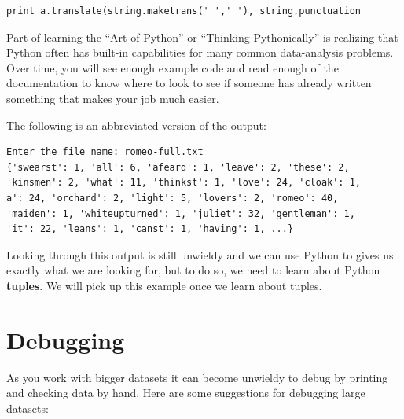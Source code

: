 \documentclass[10pt]{book}
\begin{document}
\beforeverb
\begin{verbatim}
print a.translate(string.maketrans(' ',' '), string.punctuation
\end{verbatim}
\afterverb
%
Part of learning the ``Art of Python'' or ``Thinking Pythonically''
is realizing that Python
often has built-in capabilities for many common data-analysis
problems.  Over time, you will see enough example code and read
enough of the documentation to know where to look to see if someone
has already written something that makes your job much easier.

The following is an abbreviated version of the output:
\beforeverb
\begin{verbatim}
Enter the file name: romeo-full.txt
{'swearst': 1, 'all': 6, 'afeard': 1, 'leave': 2, 'these': 2, 
'kinsmen': 2, 'what': 11, 'thinkst': 1, 'love': 24, 'cloak': 1, 
a': 24, 'orchard': 2, 'light': 5, 'lovers': 2, 'romeo': 40, 
'maiden': 1, 'whiteupturned': 1, 'juliet': 32, 'gentleman': 1, 
'it': 22, 'leans': 1, 'canst': 1, 'having': 1, ...}
\end{verbatim}
\afterverb
%
Looking through this output is still unwieldy and we can use
Python to gives us exactly what we are looking for, but to do 
so, we need to learn about Python {\bf tuples}.  We
will pick up this example once we learn about tuples.

\section{Debugging}

As you work with bigger datasets it can become unwieldy to
debug by printing and checking data by hand.  Here are some
suggestions for debugging large datasets:
\end{document}
